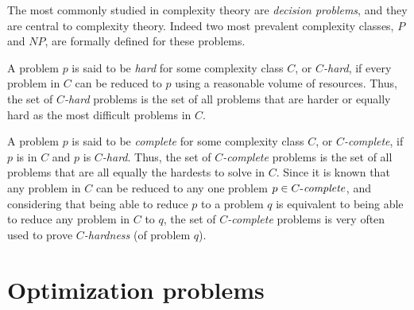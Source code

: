 	The most commonly studied in complexity theory are \emph{decision problems}, and they are central to complexity theory.
	Indeed two most prevalent complexity classes, $P$ and $NP$, are formally defined for these problems.


	A problem $p$ is said to be \emph{hard} for some complexity class $C$, or \emph{$C$-hard}, if every problem in $C$ can be reduced to $p$ using a reasonable volume of resources.
	Thus, the set of \emph{$C$-hard} problems is the set of all problems that are harder or equally hard as the most difficult problems in $C$.

	A problem $p$ is said to be \emph{complete} for some complexity class $C$, or \emph{$C$-complete}, if $p$ is in $C$ and $p$ is \emph{$C$-hard}.
	Thus, the set of \emph{$C$-complete} problems is the set of all problems that are all equally the hardests to solve in $C$.
	Since it is known that any problem in $C$ can be reduced to any one problem $p \in C\text{-\emph{complete}}$, and considering that being able to reduce $p$ to a problem $q$ is equivalent to being able to reduce any problem in $C$ to $q$, the set of \emph{$C$-complete} problems is very often used to prove \emph{$C$-hardness} (of problem $q$).


\section{Optimization problems}
\label{sec:optproblems}

